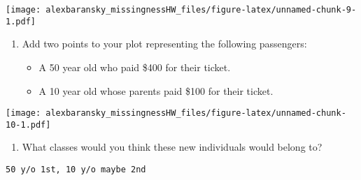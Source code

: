 \documentclass[]{article}
\newenvironment{Shaded}{\begin{snugshade}}{\end{snugshade}}
\newcommand{\KeywordTok}[1]{\textcolor[rgb]{0.13,0.29,0.53}{\textbf{#1}}}
\newcommand{\DataTypeTok}[1]{\textcolor[rgb]{0.13,0.29,0.53}{#1}}
\newcommand{\DecValTok}[1]{\textcolor[rgb]{0.00,0.00,0.81}{#1}}
\newcommand{\StringTok}[1]{\textcolor[rgb]{0.31,0.60,0.02}{#1}}
\newcommand{\OperatorTok}[1]{\textcolor[rgb]{0.81,0.36,0.00}{\textbf{#1}}}
\newcommand{\NormalTok}[1]{#1}
\providecommand{\tightlist}{%
  \setlength{\itemsep}{0pt}\setlength{\parskip}{0pt}}
\begin{document}
\begin{Shaded}
\end{Shaded}

\texttt{[image: alexbaransky\_missingnessHW\_files/figure-latex/unnamed-chunk-9-1.pdf]}

\begin{enumerate}
\def\labelenumi{\arabic{enumi}.}
\setcounter{enumi}{2}
\tightlist
\item
  Add two points to your plot representing the following passengers:

  \begin{itemize}
  \tightlist
  \item
    A 50 year old who paid \$400 for their ticket.
  \item
    A 10 year old whose parents paid \$100 for their ticket.
  \end{itemize}
\end{enumerate}

\begin{Shaded}
\end{Shaded}

\texttt{[image: alexbaransky\_missingnessHW\_files/figure-latex/unnamed-chunk-10-1.pdf]}

\begin{enumerate}
\def\labelenumi{\arabic{enumi}.}
\setcounter{enumi}{3}
\tightlist
\item
  What classes would you think these new individuals would belong to?
\end{enumerate}

\begin{verbatim}
50 y/o 1st, 10 y/o maybe 2nd
\end{verbatim}
\end{document}
